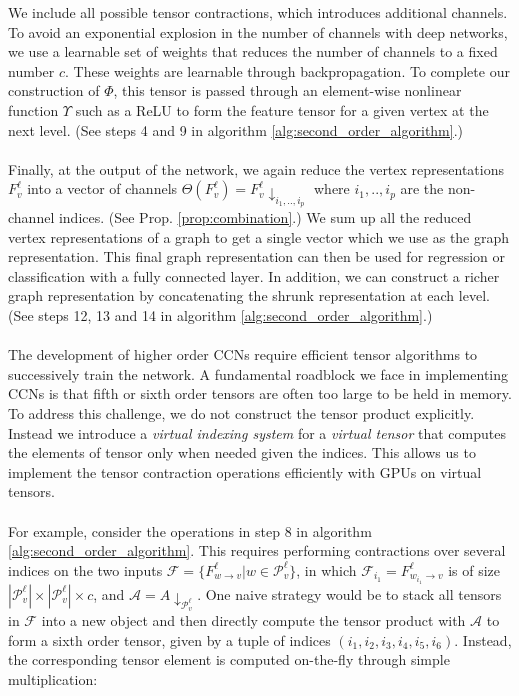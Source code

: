 \documentclass[sigchi]{acmart}
\theoremstyle{definition}
\theoremstyle{theorem}
\theoremstyle{corollary}
\theoremstyle{lemma}
\theoremstyle{remark}
\theoremstyle{prop}
\begin{document}
We include all possible tensor contractions, which introduces additional channels. To avoid an exponential explosion in the number of channels with deep networks, we use a learnable set of weights that reduces the number of channels to a fixed number $c$. These weights are learnable through backpropagation. To complete our construction of $\Phi$, this tensor is passed through an element-wise nonlinear function $\Upsilon$ such as a ReLU to form the feature tensor for a given vertex at the next level. (See steps 4 and 9 in algorithm \ref{alg:second_order_algorithm}.) \\ \\
Finally, at the output of the network, we again reduce the vertex representations $F_v^\ell$ into a vector of channels $\Theta(F_v^\ell) = F_v^\ell\downarrow_{i_1, .., i_p}$ where $i_1, .., i_p$ are the non-channel indices. (See Prop. \ref{prop:combination}.) We sum up all the reduced vertex representations of a graph to get a single vector which we use as the graph representation. This final graph representation can then be used for regression or classification with a fully connected layer. In addition, we can construct a richer graph representation by concatenating the shrunk representation at each level. (See steps 12, 13 and 14 in algorithm \ref{alg:second_order_algorithm}.) \\ \\
The development of higher order CCNs require efficient tensor algorithms to successively train the network. A fundamental roadblock we face in implementing CCNs is that fifth or sixth order tensors are often too large to be held in memory. To address this challenge, we do not construct the tensor product explicitly. Instead we introduce a \textit{virtual indexing system} for a \textit{virtual tensor} that computes the elements of tensor only when needed given the indices. This allows us to implement the tensor contraction operations efficiently with GPUs on virtual tensors. \\ \\
For example, consider the operations in step 8 in algorithm \ref{alg:second_order_algorithm}.  This requires performing contractions over several indices on the two inputs $\mathcal{F} = \{F_{w \rightarrow v}^\ell | w \in \mathcal{P}_v^\ell\}$, in which $\mathcal{F}_{i_1} = F_{w_{i_1} \rightarrow v}^\ell$ is of size $|\mathcal{P}_v^\ell| \times |\mathcal{P}_v^\ell| \times c$, and $\mathcal{A} = A\downarrow_{\mathcal{P}_v^\ell}$. One naive strategy would be to stack all tensors in $\mathcal{F}$ into a new object and then directly compute the tensor product with $\mathcal{A}$ to form a sixth order tensor, given by a tuple of indices $(i_1, i_2, i_3, i_4, i_5, i_6)$. Instead, the corresponding tensor element is computed on-the-fly through simple multiplication:
\end{document}
